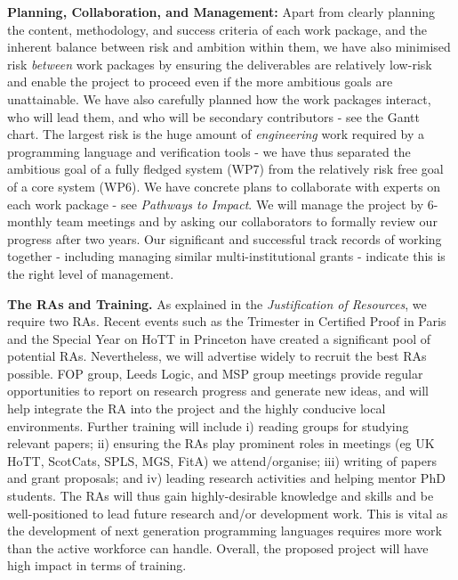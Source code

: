 \documentclass[a4paper,11pt]{article}
\begin{document}

{\bf Planning, Collaboration, and Management:} Apart from clearly
planning the content, methodology, and success criteria of each work package,
and the inherent balance between risk and ambition
within them, we have also minimised risk {\em between} work packages
by ensuring the deliverables are relatively low-risk and
enable the project to proceed even if the
more ambitious goals are unattainable. We have also carefully planned how the work
packages interact, who will lead them, and who will be secondary
contributors - see the Gantt chart. The largest risk is the huge
amount of {\em engineering} work required by a programming language
and verification tools - we have thus separated the ambitious
goal of a fully fledged system (WP7) from the relatively risk free
goal of a core system (WP6). We have concrete plans to collaborate
with experts on each work package - see {\em Pathways to Impact}. We
will manage the project by 6-monthly team meetings and by asking our
collaborators to formally review our progress after two years.  Our
significant and successful track records of working together -
including managing similar multi-institutional grants - indicate
this is the right level of management.


{\bf The RAs and Training.} As explained in the
{\em Justification of Resources}, we require two RAs.
Recent events such as the Trimester in Certified Proof in Paris
and the Special Year on HoTT in Princeton have created a significant pool of
potential RAs. Nevertheless, we will advertise widely to recruit the best RAs
possible.  FOP group, Leeds Logic, and MSP group meetings provide
regular opportunities to report on research progress and generate new
ideas, and will help integrate the RA into the project and the highly
conducive local environments. Further training will include i) reading
groups for studying relevant papers; ii) ensuring the RAs play
prominent roles in meetings (eg UK HoTT, ScotCats, SPLS, MGS, FitA) we
attend/organise; iii) writing of papers and grant proposals; and
iv) leading research activities and helping mentor PhD students.
The RAs will thus gain highly-desirable
knowledge and skills and be well-positioned to lead future research
and/or development work. This is vital as the development of
next generation programming languages requires more work than the
active workforce can handle. Overall, the proposed project will have
high impact in terms of training.
\end{document}
